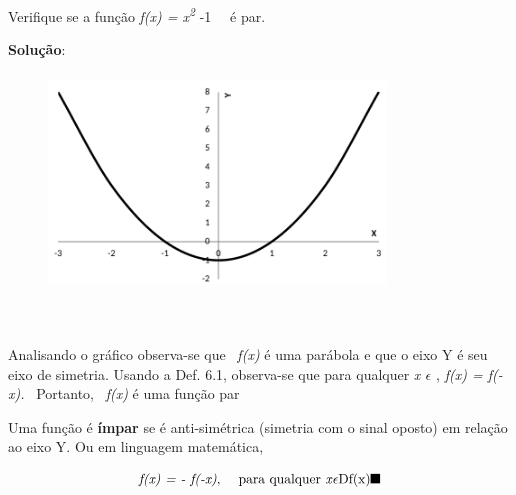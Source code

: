 \begin{texemplo}

Verifique se a função \textit{f(x) = x\textsuperscript{2}} -1~~ é par.

\textbf{ Solução}: 

\begin{figure}[H]
	\begin{Center}
		\includegraphics[width=3.53in,height=2.28in]{capitulos/outras_funcoes/media/image26.pdf}
	\end{Center}
\end{figure}

~~

Analisando o gráfico observa-se que~ \textit{f(x)} é uma parábola e que o eixo Y é seu eixo de simetria. Usando a Def. 6.1, observa-se que para qualquer \textit{x $ \epsilon $  \textbf{ }}, \textit{f(x) = f(-x).}~ Portanto,~ \textit{f(x)} é uma função par \qedsymbol{}
\end{texemplo}

\begin{caixa}
\begin{tdefinicao}
Uma função é \textbf{ímpar} se é anti-simétrica (simetria com o sinal oposto) em relação ao eixo Y. Ou em linguagem matemática,

	$$\textrm{\textit{f(x) = - f(-x)}, \quad para qualquer \textit{x}} \epsilon \textrm{Df(x)} \qedsymbol{}$$
\end{tdefinicao}
\end{caixa}

